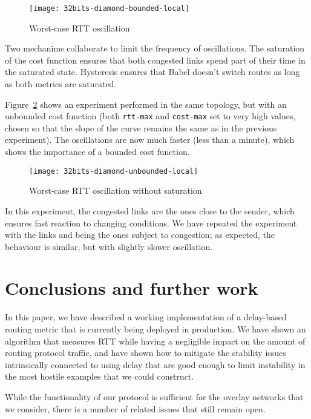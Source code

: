 \documentclass[conference,letterpaper]{IEEEtran}
\begin{document}
\begin{figure}[htb]
\centering
\texttt{[image: 32bits-diamond-bounded-local]}
\caption{Worst-case RTT oscillation}
\label{fig:diamond-stability-rtt}
\end{figure}

Two mechanims collaborate to limit the frequency of oscillations.  The
saturation of the cost function ensures that both congested links
spend part of their time in the saturated state.  Hysteresis ensures
that Babel doesn't switch routes as long as both metrics are saturated.

Figure~\ref{fig:diamond-stability-rtt-unbounded} shows an experiment
performed in the same topology, but with an unbounded cost function
(both \verb|rtt-max| and \verb|cost-max| set to very high values,
chosen so that the slope of the curve remains the same as in the
previous experiment).  The oscillations are now much faster (less than
a minute), which shows the importance of a bounded cost function.

\begin{figure}[htb]
\centering
\texttt{[image: 32bits-diamond-unbounded-local]}
\caption{Worst-case RTT oscillation without saturation}
\label{fig:diamond-stability-rtt-unbounded}
\end{figure}

In this experiment, the congested links are the ones close to the
sender, which ensures fast reaction to changing conditions.  We have
repeated the experiment with the links  and  being
the ones subject to congestion; as expected, the behaviour is similar,
but with slightly slower oscillation.

\section{Conclusions and further work}

In this paper, we have described a working implementation of
a delay-based routing metric that is currently being deployed in
production.  We have shown an algorithm that measures RTT while having
a negligible impact on the amount of routing protocol traffic, and
have shown how to mitigate the stability issues intrinsically
connected to using delay that are good enough to limit instability in
the most hostile examples that we could construct.

While the functionality of our protocol is sufficient for the overlay
networks that we consider, there is a number of related issues that
still remain open.
\end{document}
